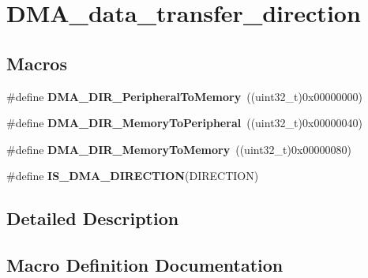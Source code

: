 \hypertarget{group___d_m_a__data__transfer__direction}{}\section{D\+M\+A\+\_\+data\+\_\+transfer\+\_\+direction}
\label{group___d_m_a__data__transfer__direction}
\subsection*{Macros}
\begin{DoxyCompactItemize}
\item 
\hypertarget{group___d_m_a__data__transfer__direction_ga4d7847b57371eef92ec5da34511416a7}{}\#define {\bfseries D\+M\+A\+\_\+\+D\+I\+R\+\_\+\+Peripheral\+To\+Memory}~((uint32\+\_\+t)0x00000000)\label{group___d_m_a__data__transfer__direction_ga4d7847b57371eef92ec5da34511416a7}

\item 
\hypertarget{group___d_m_a__data__transfer__direction_gae1e6aa2722beb09b5be7140205244986}{}\#define {\bfseries D\+M\+A\+\_\+\+D\+I\+R\+\_\+\+Memory\+To\+Peripheral}~((uint32\+\_\+t)0x00000040)\label{group___d_m_a__data__transfer__direction_gae1e6aa2722beb09b5be7140205244986}

\item 
\hypertarget{group___d_m_a__data__transfer__direction_gafb7d5b786f2fb56a903936cdc6d5e89a}{}\#define {\bfseries D\+M\+A\+\_\+\+D\+I\+R\+\_\+\+Memory\+To\+Memory}~((uint32\+\_\+t)0x00000080)\label{group___d_m_a__data__transfer__direction_gafb7d5b786f2fb56a903936cdc6d5e89a}

\item 
\#define {\bfseries I\+S\+\_\+\+D\+M\+A\+\_\+\+D\+I\+R\+E\+C\+T\+I\+O\+N}(D\+I\+R\+E\+C\+T\+I\+O\+N)
\end{DoxyCompactItemize}


\subsection{Detailed Description}


\subsection{Macro Definition Documentation}
\hypertarget{group___d_m_a__data__transfer__direction_gae2b02e8e823854bcd7c5746cdd29e70d}{}
